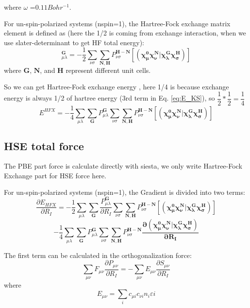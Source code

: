 \documentclass[aps,preprint,12pt]{revtex4-1}
\begin{document}
where  $\omega$ =$0.11 Bohr^{-1}$.



For un-spin-polarized systems (nspin=1), the Hartree-Fock exchange matrix element is defined as (here the 1/2 is coming from exchange interaction, when we use slater-determinant to get HF total energy): 
\begin{equation}
  [V^{X}]_{\mu\lambda}^{\mathbf{G}}=-\frac{1}{2}\sum_{\nu\sigma}\sum_{\mathbf{N,H}}P_{\nu\sigma}^\mathbf{H-N}\mathbf{[(\chi_{\mu}^{0}\chi_{\nu}^{N}|\chi_{\lambda}^{G}\chi_{\sigma}^{H})]}
\end{equation}
where $\mathbf{G}$, $\mathbf{N}$, and $\mathbf{H}$ represent different unit cells.


So we can get  Hartree-Fock exchange energy , here 1/4 is because exchange energy is always 1/2 of hartree energy (3rd term in Eq. \ref{eq:E_KS}), so $\dfrac{1}{2}*\dfrac{1}{2}=\dfrac{1}{4} $
 \begin{equation}
  E^{HFX}=-\frac{1}{4}\sum_{\mu \lambda}\sum_{\mathbf{G}}{ P_{\mu\lambda}^{\mathbf{G}} }  \sum_{\nu\sigma}\sum_{\mathbf{N,H}}
 P_{\nu\sigma}^\mathbf{H-N}\mathbf{[(\chi_{\mu}^{0}\chi_{\nu}^{N}
  |\chi_{\lambda}^{G}\chi_{\sigma}^{H})]}
\end{equation}



\subsection{HSE total force}
The PBE part force is calculate directly with siesta, we only write Hartree-Fock Exchange part for HSE force here.


For un-spin-polarized systems (nspin=1), the Gradient is divided into two terms:
\begin{equation}
 \dfrac{\partial{E_{HFX}}}{\partial{R_{I}}}
=-\frac{1}{2}\sum_{\mu\lambda}\sum_{\mathbf{G}}\dfrac{P_{\mu\lambda}^{\mathbf{G}}}{\partial{R_{I}}}\sum_{\nu\sigma}\sum_{\mathbf{N,H}}P_{\nu\sigma}^\mathbf{H-N}\mathbf{[(\chi_{\mu}^{0}\chi_{\nu}^{N}|\chi_{\lambda}^{G}\chi_{\sigma}^{H})]}
\end{equation}
\[
 -\frac{1}{4}\sum_{\mu\lambda}\sum_{\mathbf{G}}P_{\mu\lambda}^{\mathbf{G}}\sum_{\nu\sigma}\sum_{\mathbf{N,H}}P_{\nu\sigma}^\mathbf{H-N}\mathbf{ \dfrac{\partial{(\chi_{\mu}^{0}\chi_{\nu}^{N}|\chi_{\lambda}^{G}\chi_{\sigma}^{H})}}{\partial{R_{I}}} }
\]


The first term can be calculated in the orthogonalization force:
\begin{equation}
 \sum_{\mu\nu}{F_{\mu\nu}\dfrac{\partial{P_{\mu\nu}}}{\partial{R_{I}}}}=
-\sum_{\mu\nu}{E_{\mu\nu}\dfrac{\partial{S_{\mu\nu}}}{\partial{R_{I}}}}
\end{equation}
where
\[
 E_{\mu\nu}=\sum_{i}{c_{\mu i}c_{\nu i}n_i\varepsilon{i} }
\]
\end{document}
